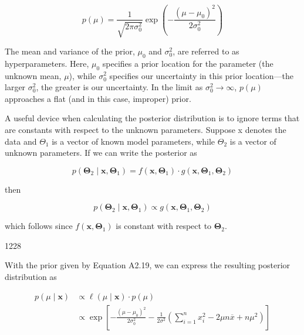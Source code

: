 \documentclass{article}
\begin{document}
\begin{equation}
p(\mu)=\frac{1}{\sqrt{2\pi\sigma_{0}^{2}}}\exp\left(-\frac{(\mu-\mu_{0})^{2}}{2\sigma_{0}^{2}}\right)
\end{equation}

The mean and variance of the prior,  $ \mu_0 $ and  $ \sigma_0^2 $, are referred to as hyperparameters. Here,  $ \mu_0 $ specifies a prior location for the parameter (the unknown mean,  $ \mu $), while  $ \sigma_0^2 $ specifies our uncertainty in this prior location—the larger  $ \sigma_0^2 $, the greater is our uncertainty. In the limit as  $ \sigma_0^2 \to \infty $,  $ p(\mu) $ approaches a flat (and in this case, improper) prior.

A useful device when calculating the posterior distribution is to ignore terms that are constants with respect to the unknown parameters. Suppose x denotes the data and  $ \Theta_1 $ is a vector of known model parameters, while  $ \Theta_2 $ is a vector of unknown parameters. If we can write the posterior as

\begin{equation}
p(\boldsymbol{\Theta}_{2}\mid\mathbf{x},\boldsymbol{\Theta}_{1})=f(\mathbf{x},\boldsymbol{\Theta}_{1})\cdot g(\mathbf{x},\boldsymbol{\Theta}_{1},\boldsymbol{\Theta}_{2})
\end{equation}

then

\begin{equation}
p(\boldsymbol{\Theta}_{2}\mid\mathbf{x},\boldsymbol{\Theta}_{1})\propto g(\mathbf{x},\boldsymbol{\Theta}_{1},\boldsymbol{\Theta}_{2})
\end{equation}

which follows since  $ f(\mathbf{x}, \boldsymbol{\Theta}_{1}) $ is constant with respect to  $ \boldsymbol{\Theta}_{2} $.

1228

With the prior given by Equation A2.19, we can express the resulting posterior distribution as

\begin{equation}
\begin{aligned}p(\mu\mid\mathbf{x})&\propto\ell(\mu\mid\mathbf{x})\cdot p(\mu)\\&\propto\exp\left[-\frac{(\mu-\mu_{0})^{2}}{2\sigma_{0}^{2}}-\frac{1}{2\sigma^{2}}\left(\sum_{i=1}^{n}x_{i}^{2}-2\mu n\overline{x}+n\mu^{2}\right)\right]\end{aligned}
\end{equation}
\end{document}

